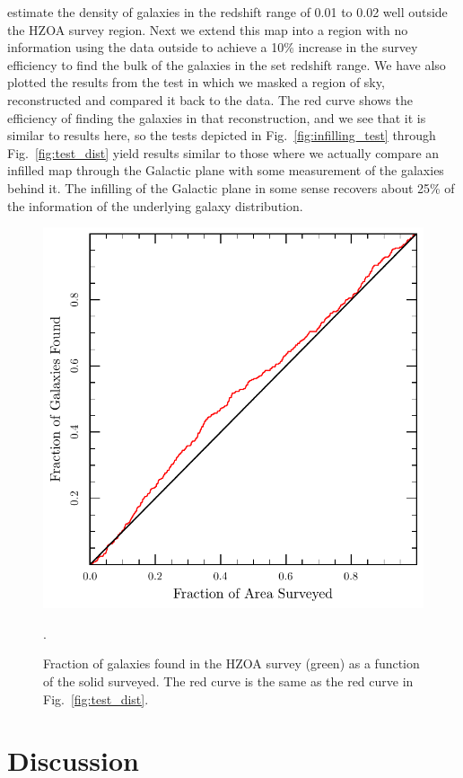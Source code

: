 \documentclass[useAMS,usenatbib]{mn2e}
\begin{document}
estimate the density of galaxies in the redshift range of 0.01 to 0.02
well outside the HZOA survey region.  Next we extend this map into a
region with no information using the data outside to achieve a 10\%
increase in the survey efficiency to find the bulk of the galaxies in
the set redshift range.  We have also plotted the results from the
test in which we masked a region of sky, reconstructed and compared it
back to the data.  The red curve shows the efficiency of finding the
galaxies in that reconstruction, and we see that it is similar to
results here, so the tests depicted in Fig.~\ref{fig:infilling_test}
through Fig.~\ref{fig:test_dist} yield results similar to those where
we actually compare an infilled map through the Galactic plane with
some measurement of the galaxies behind it.  The infilling of the
Galactic plane in some sense recovers about 25\% of the information
of the underlying galaxy distribution.
\begin{figure}
  \includegraphics[width=\columnwidth]{hzoa_cum}
  \caption{Fraction of galaxies found in the HZOA survey (green) as a function of the solid surveyed.  The red curve is the same as the red curve in Fig.~\ref{fig:test_dist}.}.
  \label{fig:hzoa_cum}
\end{figure}



\section{Discussion}





\label{lastpage}
\end{document}
